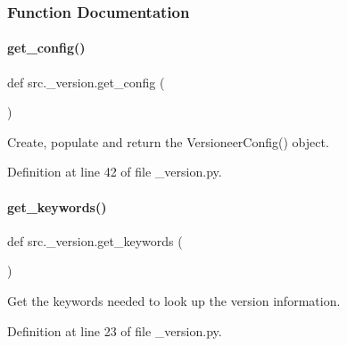 \subsubsection{Function Documentation}
\mbox{\label{namespacesrc_1_1__version_af28ed90f44f99213d839ab63b92be972}} 
\paragraph{\texorpdfstring{get\+\_\+config()}{get\_config()}}
{\footnotesize\ttfamily def src.\+\_\+version.\+get\+\_\+config (\begin{DoxyParamCaption}{ }\end{DoxyParamCaption})}



Create, populate and return the Versioneer\+Config() object. 



Definition at line 42 of file \+\_\+version.\+py.

\mbox{\label{namespacesrc_1_1__version_afdd5bbfefc2bef0d88e1406709fe7541}} 
\paragraph{\texorpdfstring{get\+\_\+keywords()}{get\_keywords()}}
{\footnotesize\ttfamily def src.\+\_\+version.\+get\+\_\+keywords (\begin{DoxyParamCaption}{ }\end{DoxyParamCaption})}



Get the keywords needed to look up the version information. 



Definition at line 23 of file \+\_\+version.\+py.

\mbox{\label{namespacesrc_1_1__version_ab09491ecacc235eeaa4a2e433ce17977}} 
